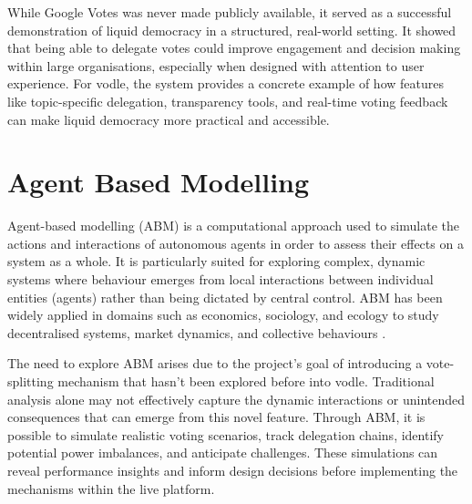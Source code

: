 While Google Votes was never made publicly available, it served as a successful demonstration of liquid democracy in a structured, real-world setting. It showed that being able to delegate votes could improve engagement and decision making within large organisations, especially when designed with attention to user experience. For vodle, the system provides a concrete example of how features like topic-specific delegation, transparency tools, and real-time voting feedback can make liquid democracy more practical and accessible.
\section{Agent Based Modelling}\label{sec:background_abm}
Agent-based modelling (ABM) is a computational approach used to simulate the actions and interactions of autonomous agents in order to assess their effects on a system as a whole. It is particularly suited for exploring complex, dynamic systems where behaviour emerges from local interactions between individual entities (agents) rather than being dictated by central control. ABM has been widely applied in domains such as economics, sociology, and ecology to study decentralised systems, market dynamics, and collective behaviours \citep{bonabeau2002agent}.

The need to explore ABM arises due to the project's goal of introducing a vote-splitting mechanism that hasn't been explored before into vodle. Traditional analysis alone may not effectively capture the dynamic interactions or unintended consequences that can emerge from this novel feature. Through ABM, it is possible to simulate realistic voting scenarios, track delegation chains, identify potential power imbalances, and anticipate challenges. These simulations can reveal performance insights and inform design decisions before implementing the mechanisms within the live platform.


